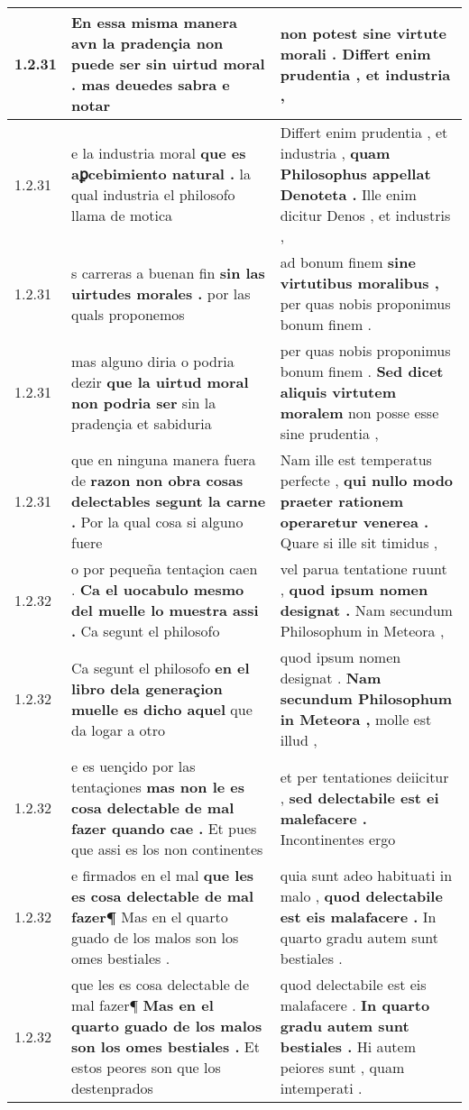 \begin{tabular}{|p{1cm}|p{6.5cm}|p{6.5cm}|}
1.2.31 & En essa misma manera avn la pradençia non puede ser \textbf{ sin uirtud moral . } mas deuedes sabra e notar & non potest \textbf{ sine virtute morali . } Differt enim prudentia , et industria , \\\hline
1.2.31 & e la industria moral \textbf{ que es aꝑcebimiento natural . } la qual industria el philosofo llama de motica & Differt enim prudentia , et industria , \textbf{ quam Philosophus appellat Denoteta . } Ille enim dicitur Denos , et industris , \\\hline
1.2.31 & s carreras a buenan fin \textbf{ sin las uirtudes morales . } por las quals proponemos & ad bonum finem \textbf{ sine virtutibus moralibus , } per quas nobis proponimus bonum finem . \\\hline
1.2.31 & mas alguno diria o podria dezir \textbf{ que la uirtud moral non podria ser } sin la pradençia et sabiduria & per quas nobis proponimus bonum finem . \textbf{ Sed dicet aliquis virtutem moralem } non posse esse sine prudentia , \\\hline
1.2.31 & que en ninguna manera fuera de \textbf{ razon non obra cosas delectables segunt la carne . } Por la qual cosa si alguno fuere & Nam ille est temperatus perfecte , \textbf{ qui nullo modo praeter rationem operaretur venerea . } Quare si ille sit timidus , \\\hline
1.2.32 & o por pequeña tentaçion caen . \textbf{ Ca el uocabulo mesmo del muelle lo muestra assi . } Ca segunt el philosofo & vel parua tentatione ruunt , \textbf{ quod ipsum nomen designat . } Nam secundum Philosophum in Meteora , \\\hline
1.2.32 & Ca segunt el philosofo \textbf{ en el libro dela generaçion muelle es dicho aquel } que da logar a otro & quod ipsum nomen designat . \textbf{ Nam secundum Philosophum in Meteora , } molle est illud , \\\hline
1.2.32 & e es uençido por las tentaçiones \textbf{ mas non le es cosa delectable de mal fazer quando cae . } Et pues que assi es los non continentes & et per tentationes deiicitur , \textbf{ sed delectabile est ei malefacere . } Incontinentes ergo \\\hline
1.2.32 & e firmados en el mal \textbf{ que les es cosa delectable de mal fazer¶ } Mas en el quarto guado de los malos son los omes bestiales . & quia sunt adeo habituati in malo , \textbf{ quod delectabile est eis malafacere . } In quarto gradu autem sunt bestiales . \\\hline
1.2.32 & que les es cosa delectable de mal fazer¶ \textbf{ Mas en el quarto guado de los malos son los omes bestiales . } Et estos peores son que los destenprados & quod delectabile est eis malafacere . \textbf{ In quarto gradu autem sunt bestiales . } Hi autem peiores sunt , quam intemperati . \\\hline

\end{tabular}
